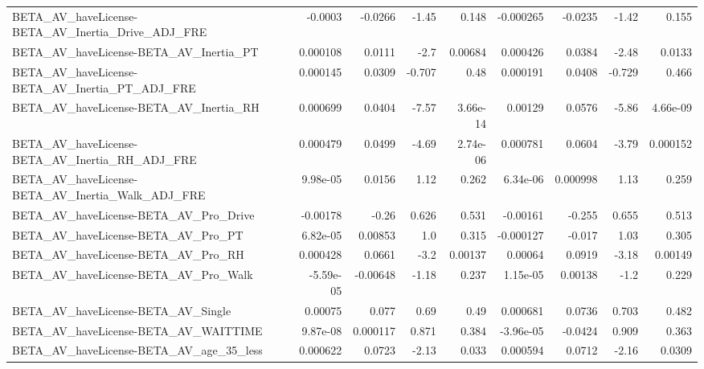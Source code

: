 \begin{tabular}{lrrrrrrrr}
BETA\_AV\_haveLicense-BETA\_AV\_Inertia\_Drive\_ADJ\_FRE  &     -0.0003 &      -0.0266 &    -1.45 &    0.148 &  -0.000265 &     -0.0235 &        -1.42 &         0.155 \\
BETA\_AV\_haveLicense-BETA\_AV\_Inertia\_PT             &    0.000108 &       0.0111 &     -2.7 &  0.00684 &   0.000426 &      0.0384 &        -2.48 &        0.0133 \\
BETA\_AV\_haveLicense-BETA\_AV\_Inertia\_PT\_ADJ\_FRE     &    0.000145 &       0.0309 &   -0.707 &     0.48 &   0.000191 &      0.0408 &       -0.729 &         0.466 \\
BETA\_AV\_haveLicense-BETA\_AV\_Inertia\_RH             &    0.000699 &       0.0404 &    -7.57 & 3.66e-14 &    0.00129 &      0.0576 &        -5.86 &      4.66e-09 \\
BETA\_AV\_haveLicense-BETA\_AV\_Inertia\_RH\_ADJ\_FRE     &    0.000479 &       0.0499 &    -4.69 & 2.74e-06 &   0.000781 &      0.0604 &        -3.79 &      0.000152 \\
BETA\_AV\_haveLicense-BETA\_AV\_Inertia\_Walk\_ADJ\_FRE   &    9.98e-05 &       0.0156 &     1.12 &    0.262 &   6.34e-06 &    0.000998 &         1.13 &         0.259 \\
BETA\_AV\_haveLicense-BETA\_AV\_Pro\_Drive              &    -0.00178 &        -0.26 &    0.626 &    0.531 &   -0.00161 &      -0.255 &        0.655 &         0.513 \\
BETA\_AV\_haveLicense-BETA\_AV\_Pro\_PT                 &    6.82e-05 &      0.00853 &      1.0 &    0.315 &  -0.000127 &      -0.017 &         1.03 &         0.305 \\
BETA\_AV\_haveLicense-BETA\_AV\_Pro\_RH                 &    0.000428 &       0.0661 &     -3.2 &  0.00137 &    0.00064 &      0.0919 &        -3.18 &       0.00149 \\
BETA\_AV\_haveLicense-BETA\_AV\_Pro\_Walk               &   -5.59e-05 &     -0.00648 &    -1.18 &    0.237 &   1.15e-05 &     0.00138 &         -1.2 &         0.229 \\
BETA\_AV\_haveLicense-BETA\_AV\_Single                 &     0.00075 &        0.077 &     0.69 &     0.49 &   0.000681 &      0.0736 &        0.703 &         0.482 \\
BETA\_AV\_haveLicense-BETA\_AV\_WAITTIME               &    9.87e-08 &     0.000117 &    0.871 &    0.384 &  -3.96e-05 &     -0.0424 &        0.909 &         0.363 \\
BETA\_AV\_haveLicense-BETA\_AV\_age\_35\_less            &    0.000622 &       0.0723 &    -2.13 &    0.033 &   0.000594 &      0.0712 &        -2.16 &        0.0309 \\

\end{tabular}
